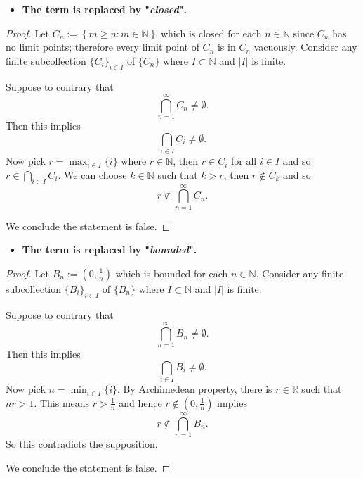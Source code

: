 \begin{Exercise}
	\begin{itemize}
		\item \textbf{The term is replaced by "\textit{closed}".}
	\end{itemize}
	\begin{proof}
		Let $C_n := \left\{m\geq n:m\in\mathbb{N}\right\}$ which is closed for each $n\in\mathbb{N}$ since $C_n$ has no limit points; therefore every limit point of $C_n$ is in $C_n$ vacuously. Consider any finite subcollection $\{C_i\}_{i\in I}$ of $\{C_n\}$ where $I\subset \mathbb{N}$ and $|I|$ is finite.
		
		Suppose to contrary that
		$$
		\bigcap_{n=1}^{\infty} C_n \neq \emptyset.
		$$
		Then this implies
		$$
		\bigcap_{i\in I} C_i \neq \emptyset.
		$$
		Now pick $r = \max_{i\in I}\{i\}$ where $r\in\mathbb{N}$, then $r\in C_i$ for all $i\in I$ and so $r\in \bigcap_{i\in I}C_i$. We can choose $k\in\mathbb{N}$ such that $k>r$, then $r\notin C_k$ and so
		$$
		r \notin \bigcap_{n=1}^{\infty}C_n.
		$$
		
		We conclude the statement is false.
	\end{proof}
	
	\begin{itemize}
		\item \textbf{The term is replaced by "\textit{bounded}".}
	\end{itemize}
	\begin{proof}
		Let $B_n := \left(0,\frac{1}{n}\right)$ which is bounded for each $n\in\mathbb{N}$. Consider any finite subcollection $\{B_i\}_{i\in I}$ of $\{B_n\}$ where $I\subset \mathbb{N}$ and $|I|$ is finite.
		
		Suppose to contrary that
		$$
		\bigcap_{n=1}^{\infty} B_n \neq \emptyset.
		$$
		Then this implies
		$$
		\bigcap_{i\in I} B_i \neq \emptyset.
		$$
		Now pick $n = \min_{i\in I}\{i\}$. By Archimedean property, there is $r\in\mathbb{R}$ such that $n r > 1$. This means $r>\frac{1}{n}$ and hence $r\notin\left(0, \frac{1}{n} \right)$ implies
		$$
		r\notin \bigcap_{n=1}^{\infty} B_n.
		$$
		So this contradicts the supposition.
		
		We conclude the statement is false.
	\end{proof}
\end{Exercise}